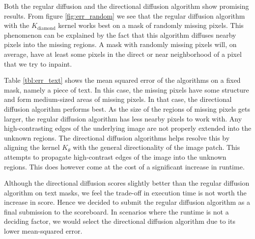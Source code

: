 Both the regular diffusion and the directional diffusion algorithm show promising results. From figure \ref{fig:err_random} we see that the regular diffusion algorithm with the $K_{\text{diamond}}$ kernel works best on a mask of randomly missing pixels. This phenomenon can be explained by the fact that this algorithm diffuses nearby pixels into the missing regions. A mask with randomly missing pixels will, on average, have at least some pixels in the direct or near neighborhood of a pixel that we try to inpaint.


Table \ref{tbl:err_text} shows the mean squared error of the algorithms on a fixed mask, namely a piece of text. In this case, the missing pixels have some structure and form medium-sized areas of missing pixels. In that case, the directional diffusion algorithm performs best. As the size of the regions of missing pixels gets larger, the regular diffusion algorithm has less nearby pixels to work with. Any high-contrasting edges of the underlying image are not properly extended into the unknown regions. The directional diffusion algorithms helps resolve this by aligning the kernel  $K_{\theta}$ with the general directionality of the image patch. This attempts to propagate high-contrast edges of the image into the unknown regions. This does however come at the cost of a significant increase in runtime.

Although the directional diffusion scores slightly better than the regular diffusion algorithm on text masks, we feel the trade-off in execution time is not worth the increase in score. Hence we decided to submit the regular diffusion algorithm as a final submission to the scoreboard. In scenarios where the runtime is not a deciding factor, we would select the directional diffusion algorithm due to its lower mean-squared error.